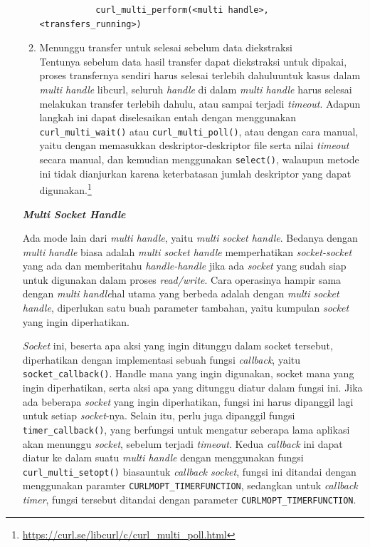 \documentclass[a4paper,twoside]{article}
\begin{document}
\begin{enumerate}
\begin{enumerate}
\begin{verbatim}
           curl_multi_perform(<multi handle>, <transfers_running>)
\end{verbatim}

	\item Menunggu transfer untuk selesai sebelum data diekstraksi\\
	Tentunya sebelum data hasil transfer dapat diekstraksi untuk dipakai, proses transfernya sendiri harus selesai terlebih dahulu\textemdash untuk kasus dalam \textit{multi handle} libcurl, seluruh \textit{handle} di dalam \textit{multi handle} harus selesai melakukan transfer terlebih dahulu, atau sampai terjadi \textit{timeout}. Adapun langkah ini dapat diselesaikan entah dengan menggunakan \verb|curl_multi_wait()| atau \verb|curl_multi_poll()|, atau dengan cara manual, yaitu dengan memasukkan deskriptor-deskriptor file serta nilai \textit{timeout} secara manual, dan kemudian menggunakan \verb|select()|, walaupun metode ini tidak dianjurkan karena keterbatasan jumlah deskriptor yang dapat digunakan.\footnote{\href{https://curl.se/libcurl/c/curl\_multi\_poll.html}{https://curl.se/libcurl/c/curl\_multi\_poll.html}}
\end{enumerate}

\textbf{\textit{Multi Socket Handle}}

Ada mode lain dari \textit{multi handle}, yaitu \textit{multi socket handle}. Bedanya dengan \textit{multi handle} biasa adalah \textit{multi socket handle} memperhatikan \textit{socket-socket} yang ada dan memberitahu \textit{handle-handle} jika ada \textit{socket} yang sudah siap untuk digunakan dalam proses \textit{read/write}. Cara operasinya hampir sama dengan \textit{multi handle}\textemdash hal utama yang berbeda adalah dengan \textit{multi socket handle}, diperlukan satu buah parameter tambahan, yaitu kumpulan \textit{socket} yang ingin diperhatikan.

\textit{Socket} ini, beserta apa aksi yang ingin ditunggu dalam socket tersebut, diperhatikan dengan implementasi sebuah fungsi \textit{callback}, yaitu \verb|socket_callback()|. Handle mana yang ingin digunakan, socket mana yang ingin diperhatikan, serta aksi apa yang ditunggu diatur dalam fungsi ini. Jika ada beberapa \textit{socket} yang ingin diperhatikan, fungsi ini harus dipanggil lagi untuk setiap \textit{socket}-nya. Selain itu, perlu juga dipanggil fungsi \verb|timer_callback()|, yang berfungsi untuk mengatur seberapa lama aplikasi akan menunggu \textit{socket}, sebelum terjadi \textit{timeout}. Kedua \textit{callback} ini dapat diatur ke dalam suatu \textit{multi handle} dengan menggunakan fungsi \verb|curl_multi_setopt()| biasa\textemdash untuk \textit{callback socket}, fungsi ini ditandai dengan menggunakan paramter \verb|CURLMOPT_TIMERFUNCTION|, sedangkan untuk \textit{callback timer}, fungsi tersebut ditandai dengan parameter \verb|CURLMOPT_TIMERFUNCTION|.


\end{enumerate}
\end{document}
